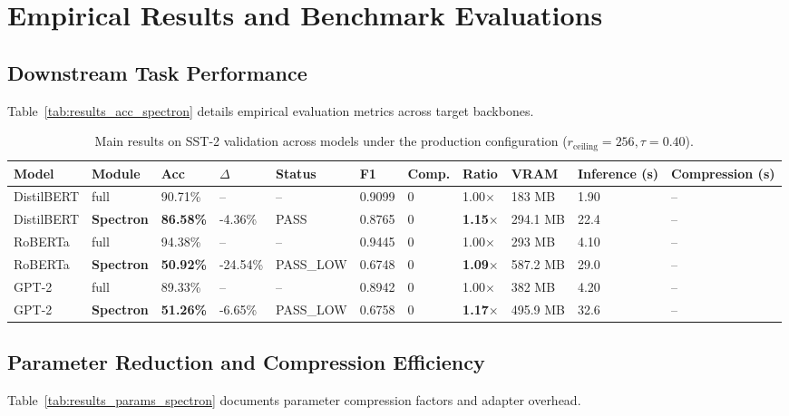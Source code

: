 \section{Empirical Results and Benchmark Evaluations}

\subsection{Downstream Task Performance}
Table~\ref{tab:results_acc_spectron} details empirical evaluation metrics across target backbones.

\begin{table}[t]
\centering
\small
\begin{tabular}{lllllllllll}
\toprule
\textbf{Model} & \textbf{Module} & \textbf{Acc} & \textbf{$\Delta$} & \textbf{Status} & \textbf{F1} & \textbf{Comp.} & \textbf{Ratio} & \textbf{VRAM} & \textbf{Inference (s)} & \textbf{Compression (s)} \\
\midrule
DistilBERT & full & 90.71\% & -- & -- & 0.9099 & 0 & 1.00$\times$ & 183 MB & 1.90 & -- \\
DistilBERT & \textbf{Spectron} & \textbf{86.58\%} & -4.36\% & PASS & 0.8765 & 0 & \textbf{1.15$\times$} & 294.1 MB & 22.4 & -- \\
RoBERTa & full & 94.38\% & -- & -- & 0.9445 & 0 & 1.00$\times$ & 293 MB & 4.10 & -- \\
RoBERTa & \textbf{Spectron} & \textbf{50.92\%} & -24.54\% & PASS\_LOW & 0.6748 & 0 & \textbf{1.09$\times$} & 587.2 MB & 29.0 & -- \\
GPT-2 & full & 89.33\% & -- & -- & 0.8942 & 0 & 1.00$\times$ & 382 MB & 4.20 & -- \\
GPT-2 & \textbf{Spectron} & \textbf{51.26\%} & -6.65\% & PASS\_LOW & 0.6758 & 0 & \textbf{1.17$\times$} & 495.9 MB & 32.6 & -- \\
\bottomrule
\end{tabular}
\caption{Main results on SST-2 validation across models under the production configuration ($r_{\mathrm{ceiling}}=256, \tau=0.40$).}
\label{tab:main_sst2}
\end{table}

\subsection{Parameter Reduction and Compression Efficiency}
Table~\ref{tab:results_params_spectron} documents parameter compression factors and adapter overhead.

